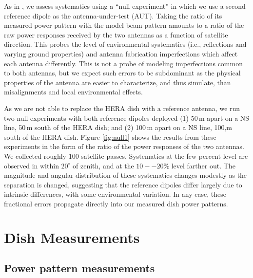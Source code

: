 \documentclass{emulateapj}
\begin{document}
As in \citet{neben15}, we assess systematics using a ``null experiment'' in which we use a second reference dipole as the antenna-under-test (AUT). Taking the ratio of its measured power pattern with the model beam pattern amounts to a ratio of the raw power responses received by the two antennas as a function of satellite direction. This probes the level of environmental systematics (i.e., reflections and varying ground properties) and antenna fabrication imperfections which affect each antenna differently. This is not a probe of modeling imperfections common to both antennas, but we expect such errors to be subdominant as the physical properties of the antenna are easier to characterize, and thus simulate, than misalignments and local environmental effects. 

As we are not able to replace the HERA dish with a reference antenna, we run two null experiments with both reference dipoles deployed (1) 50\,m apart on a NS line, 50\,m south of the HERA dish; and (2) 100\,m apart on a NS line, 100,m south of the HERA dish. Figure \ref{fig:null1} shows the  results from these experiments in the form of the ratio of the power responses of the two antennas. We collected roughly 100 satellite passes. Systematics at the few percent level are observed in  within $20^\circ$ of zenith, and at the $10--20\%$ level farther out. The magnitude and angular distribution of these systematics changes modestly as the separation is changed, suggesting that the reference dipoles differ largely due to intrinsic differences, with some environmental variation. In any case, these fractional errors propagate directly into our measured dish power patterns.

\section{Dish Measurements}

\subsection{Power pattern measurements}
\end{document}
